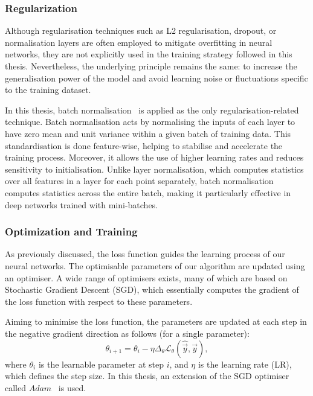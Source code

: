 \subsubsection{Regularization}

Although regularisation techniques such as L2 regularisation, dropout, or normalisation layers are often employed to mitigate overfitting in neural networks, they are not explicitly used in the training strategy followed in this thesis. Nevertheless, the underlying principle remains the same: to increase the generalisation power of the model and avoid learning noise or fluctuations specific to the training dataset.

In this thesis, batch normalisation~\cite{ioffe2015batchnormalizationacceleratingdeep} is applied as the only regularisation-related technique. Batch normalisation acts by normalising the inputs of each layer to have zero mean and unit variance within a given batch of training data. This standardisation is done feature-wise, helping to stabilise and accelerate the training process. Moreover, it allows the use of higher learning rates and reduces sensitivity to initialisation. Unlike layer normalisation, which computes statistics over all features in a layer for each point separately, batch normalisation computes statistics across the entire batch, making it particularly effective in deep networks trained with mini-batches.

\subsubsection{Optimization and Training}

As previously discussed, the loss function guides the learning process of our neural networks. The optimisable parameters of our algorithm are updated using an optimiser. A wide range of optimisers exists, many of which are based on Stochastic Gradient Descent (SGD), which essentially computes the gradient of the loss function with respect to these parameters.

Aiming to minimise the loss function, the parameters are updated at each step in the negative gradient direction as follows (for a single parameter):
\begin{equation}
    \theta_{i+1} = \theta_{i} - \eta \Delta_{\theta}\mathcal{L}_{\theta}(\hat{\vec{y}},\vec{y}),
\end{equation}
where $\theta_{i}$ is the learnable parameter at step $i$, and $\eta$ is the learning rate (LR), which defines the step size. In this thesis, an extension of the SGD optimiser called $Adam$~\cite{kingma2017adammethodstochasticoptimization} is used.

